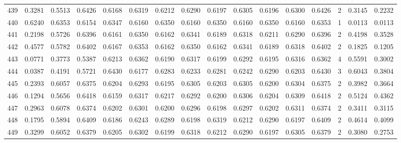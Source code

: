 \begin{tabular}{lrrrrrrrrrrrrrrr}
439 &      0.3281 &  0.5513 &  0.6426 &  0.6168 &  0.6319 &  0.6212 &  0.6290 &  0.6197 &  0.6305 &  0.6196 &   0.6300 &     0.6426 &      2 &                    0.3145 &                     0.2232 \\
440 &      0.6240 &  0.6353 &  0.6154 &  0.6347 &  0.6160 &  0.6350 &  0.6160 &  0.6350 &  0.6160 &  0.6350 &   0.6160 &     0.6353 &      1 &                    0.0113 &                     0.0113 \\
441 &      0.2198 &  0.5726 &  0.6396 &  0.6161 &  0.6350 &  0.6162 &  0.6341 &  0.6189 &  0.6318 &  0.6211 &   0.6290 &     0.6396 &      2 &                    0.4198 &                     0.3528 \\
442 &      0.4577 &  0.5782 &  0.6402 &  0.6167 &  0.6353 &  0.6162 &  0.6350 &  0.6162 &  0.6341 &  0.6189 &   0.6318 &     0.6402 &      2 &                    0.1825 &                     0.1205 \\
443 &      0.0771 &  0.3773 &  0.5387 &  0.6213 &  0.6362 &  0.6190 &  0.6317 &  0.6199 &  0.6292 &  0.6195 &   0.6316 &     0.6362 &      4 &                    0.5591 &                     0.3002 \\
444 &      0.0387 &  0.4191 &  0.5721 &  0.6430 &  0.6177 &  0.6283 &  0.6233 &  0.6281 &  0.6242 &  0.6290 &   0.6203 &     0.6430 &      3 &                    0.6043 &                     0.3804 \\
445 &      0.2393 &  0.6057 &  0.6375 &  0.6204 &  0.6293 &  0.6195 &  0.6305 &  0.6203 &  0.6305 &  0.6200 &   0.6304 &     0.6375 &      2 &                    0.3982 &                     0.3664 \\
446 &      0.1294 &  0.5656 &  0.6418 &  0.6159 &  0.6317 &  0.6217 &  0.6292 &  0.6200 &  0.6306 &  0.6204 &   0.6309 &     0.6418 &      2 &                    0.5124 &                     0.4362 \\
447 &      0.2963 &  0.6078 &  0.6374 &  0.6202 &  0.6301 &  0.6200 &  0.6296 &  0.6198 &  0.6297 &  0.6202 &   0.6311 &     0.6374 &      2 &                    0.3411 &                     0.3115 \\
448 &      0.1795 &  0.5894 &  0.6409 &  0.6186 &  0.6243 &  0.6289 &  0.6198 &  0.6319 &  0.6212 &  0.6290 &   0.6197 &     0.6409 &      2 &                    0.4614 &                     0.4099 \\
449 &      0.3299 &  0.6052 &  0.6379 &  0.6205 &  0.6302 &  0.6199 &  0.6318 &  0.6212 &  0.6290 &  0.6197 &   0.6305 &     0.6379 &      2 &                    0.3080 &                     0.2753 \\

\end{tabular}
